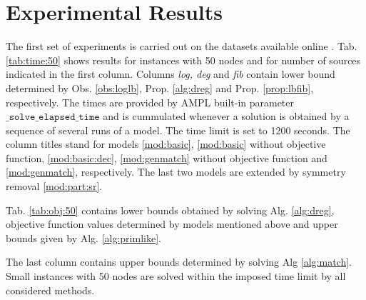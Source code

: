 \section{Experimental Results}

The first set of experiments is carried out on the datasets available online \cite{datasets, steinlib}.
Tab. \ref{tab:time:50} shows results for instances with 50 nodes and for number of sources indicated in the first column. 
Columns \emph{log, deg} and \emph{fib} contain lower bound determined by Obs. \ref{obs:loglb}, Prop. \ref{alg:dreg} and Prop. \ref{prop:lbfib}, respectively.
The times are provided by AMPL built-in parameter $\texttt{\_solve\_elapsed\_time}$ and is cummulated whenever a solution is obtained by a sequence of several runs of a model.
The time limit is set to 1200 seconds.
The column titles stand for models \eqref{mod:basic}, \eqref{mod:basic} without objective function, \eqref{mod:basic:dec}, \eqref{mod:genmatch} without objective function and \eqref{mod:genmatch}, respectively.
The last two models are extended by symmetry removal \eqref{mod:part:sr}.

Tab. \ref{tab:obj:50} contains lower bounds obtained by solving Alg. \ref{alg:dreg}, objective function values determined by models mentioned above and upper bounds given by Alg. \ref{alg:primlike}.


The last column contains upper bounds determined by solving Alg \ref{alg:match}.
Small instances with 50 nodes are solved within the imposed time limit by all considered methods. 


